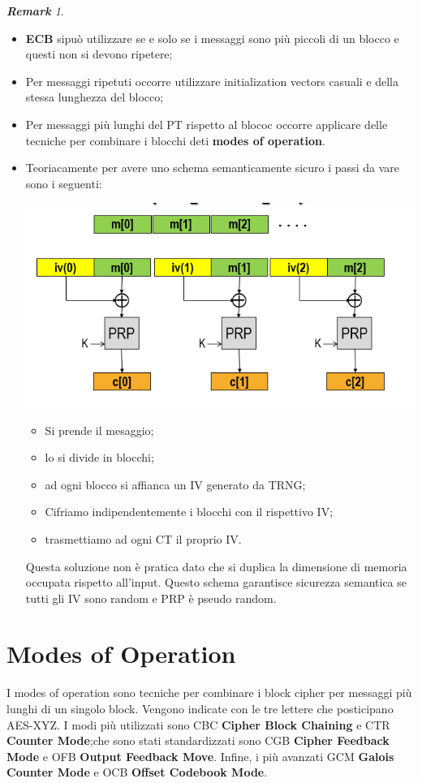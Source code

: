 \documentclass{book}
\theoremstyle{remark}
\newtheorem*{remark}{\textbf{Remark}}
\begin{document}
\begin{remark}
	\begin{itemize}
		\item \textbf{ECB} sipuò utilizzare se e solo se i messaggi sono più piccoli di un blocco e questi non si devono ripetere;\@
		\item Per messaggi ripetuti occorre utilizzare initialization vectors casuali e della stessa lunghezza del blocco;\@
		\item Per messaggi più lunghi del PT rispetto al blococ occorre applicare delle tecniche per combinare i blocchi deti \textbf{modes of operation}\@.
		\item Teoriacamente per avere uno schema semanticamente sicuro i passi da vare sono i seguenti:
		      \begin{center}
			      \includegraphics[scale=0.5]{semanticblc.png}
		      \end{center}
		      \begin{itemize}
			      \item Si prende il mesaggio;\@
			      \item lo si divide in blocchi;\@
			      \item ad ogni blocco si affianca un IV generato da TRNG;\@
			      \item Cifriamo indipendentemente i blocchi con il rispettivo IV;\@
			      \item trasmettiamo ad ogni CT il proprio IV\@.
		      \end{itemize}
		      Questa soluzione non è pratica dato che si duplica la dimensione di memoria occupata rispetto all'input\@. Questo schema garantisce sicurezza semantica se tutti gli IV sono random e PRP è pseudo random\@.
	\end{itemize}
\end{remark}
\section{Modes of Operation}
I modes of operation sono tecniche per combinare i block cipher per messaggi più lunghi di un singolo block\@. Vengono indicate con le tre lettere che posticipano AES-XYZ\@.\newline
I modi più utilizzati sono CBC \textbf{Cipher Block Chaining} e CTR \textbf{Counter Mode};\@altri che sono stati standardizzati sono CGB \textbf{Cipher Feedback Mode} e OFB \textbf{Output Feedback Move}\@. Infine, i più avanzati GCM \textbf{Galois Counter Mode} e OCB \textbf{Offset Codebook Mode}\@.
\end{document}
